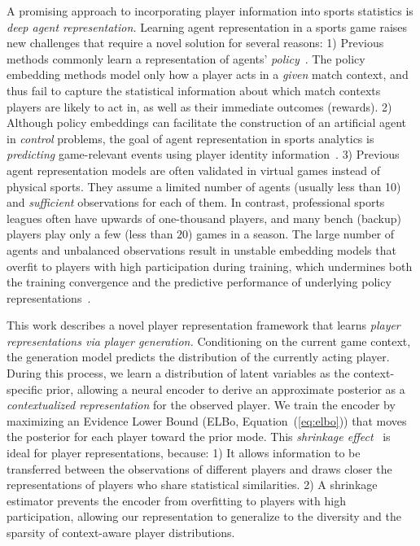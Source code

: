 \documentclass{article}
\begin{document}
A promising approach to incorporating player information into sports statistics is {\em deep agent representation.}
Learning agent representation in a sports game raises new challenges that require a novel solution 
for several reasons: {1)}
Previous methods commonly learn a representation of agents’ {\em policy}~\cite{GroverRepresent18,ChandakAction19, AlbrechtSurvey18,Kormushev13RLRobotics, Arnekvist2019PolicyEmbedding,Chen2019ActionEmbedding}. 
The policy embedding methods model only how a player acts in a {\em given} match context, and thus fail to capture the statistical information about which match contexts players are likely to act in, as well as their immediate outcomes (rewards).
{2)} Although %
policy embeddings can facilitate  the construction of an artificial agent in {\it control} problems, 
the goal of agent representation in sports analytics is {\em predicting} game-relevant events using player identity information~\cite{ganguly2018problem,schwartz}.
{3)} Previous agent representation models are often validated in virtual games instead of physical sports. They assume a limited number of agents (usually less than 10) and {\it sufficient} observations for each of them. In contrast, professional sports leagues often have upwards of one-thousand players, and many  bench (backup) players play only a few (less than $20$) games
in a season.
The large number of agents and unbalanced observations result in unstable embedding models that overfit to players with high participation during training, which undermines both the training convergence and the predictive performance of underlying policy representations~\cite{AlbrechtSurvey18}.


This work describes a novel player representation framework that learns {\em player representations via player generation.} Conditioning on the current game context, the generation model predicts the distribution of the currently acting player. During this process, we learn a distribution of latent variables as the context-specific prior, allowing a neural encoder to derive an approximate posterior as a {\it contextualized representation} for the observed player. We train the encoder by maximizing an Evidence Lower Bound (ELBo, Equation~(\ref{eq:elbo})) that moves the posterior for each player toward the prior mode. This {\em shrinkage effect}~\cite{kruschke2014doing} is ideal for player representations, because: 1) It allows information to be transferred between the observations of different players and draws closer the representations of players who share 
statistical similarities.
2) A shrinkage estimator prevents the encoder from overfitting to players with high participation, allowing our representation to generalize to the diversity and the sparsity of context-aware player distributions.
\end{document}
